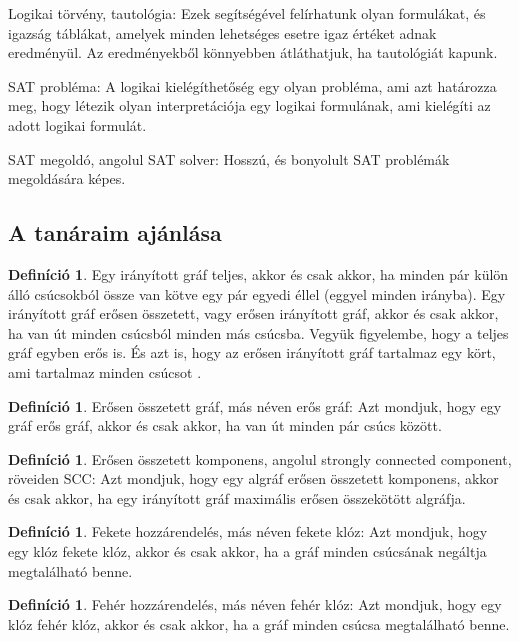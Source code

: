 \documentclass[
]{thesis-ekf}
\theoremstyle{definition}
\newtheorem{definicio}[tetel]{Definíció}
\theoremstyle{remark}
\begin{document}
	Logikai törvény, tautológia: Ezek segítségével felírhatunk olyan formulákat, és igazság táblákat, amelyek minden lehetséges esetre igaz értéket adnak eredményül. Az eredményekből könnyebben átláthatjuk, ha tautológiát kapunk.
	
	SAT probléma: A logikai kielégíthetőség egy olyan probléma, ami azt határozza meg, hogy létezik olyan interpretációja egy logikai formulának, ami kielégíti az adott logikai formulát.
	
	SAT megoldó, angolul SAT solver: Hosszú, és bonyolult SAT problémák megoldására képes.

	\subsection{A tanáraim ajánlása}\label{szakirodalom}
	\begin{definicio}
		Egy irányított gráf teljes, akkor és csak akkor, ha minden pár külön álló csúcsokból össze van kötve egy pár egyedi éllel (eggyel minden irányba). Egy irányított gráf erősen összetett, vagy erősen irányított gráf, akkor és csak akkor, ha van út minden csúcsból minden más csúcsba. Vegyük figyelembe, hogy a teljes gráf egyben erős is. És azt is, hogy az erősen irányított gráf tartalmaz egy kört, ami tartalmaz minden csúcsot \cite{synasc2020}.
	\end{definicio}

	\begin{definicio}
		Erősen összetett gráf, más néven erős gráf: Azt mondjuk, hogy egy gráf erős gráf, akkor és csak akkor, ha van út minden pár csúcs között.
	\end{definicio}
	
	\begin{definicio}
		Erősen összetett komponens, angolul strongly connected component, röveiden SCC: Azt mondjuk, hogy egy algráf erősen összetett komponens, akkor és csak akkor, ha egy irányított gráf maximális erősen összekötött algráfja. 
	\end{definicio}
	
	\begin{definicio}
		Fekete hozzárendelés, más néven fekete klóz: Azt mondjuk, hogy egy klóz fekete klóz, akkor és csak akkor, ha a gráf minden csúcsának negáltja megtalálható benne.
	\end{definicio}
	
	\begin{definicio}
		Fehér hozzárendelés, más néven fehér klóz: Azt mondjuk, hogy egy klóz fehér klóz, akkor és csak akkor, ha a gráf minden csúcsa megtalálható benne.
	\end{definicio}
	
\end{document}

